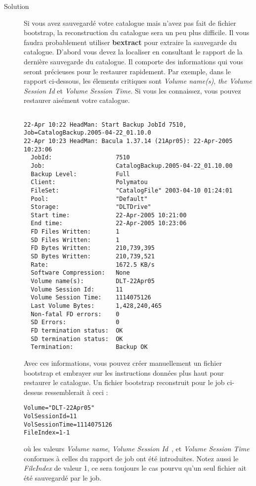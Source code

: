 \begin{description}
\item[Solution]
   Si vous avez sauvegard\'e votre catalogue mais n'avez pas fait de fichier 
   bootstrap, la reconstruction du catalogue sera un peu plus difficile. 
   Il vous faudra probablement utiliser {\bf bextract} pour extraire 
   la sauvegarde du catalogue. D'abord vous devez la localiser en 
   consultant le rapport de la derni\`ere sauvegarde du catalogue. Il comporte 
   des informations qui vous seront pr\'ecieuses pour le restaurer rapidement.
   Par exemple, dans le rapport ci-dessous, les \'elements critiques sont 
   {\it Volume name(s)}, {\it the Volume Session Id} et {\it Volume Session Time}. 
   Si vous les connaissez, vous pouvez restaurer ais\'ement votre catalogue.
\footnotesize
\begin{verbatim}

22-Apr 10:22 HeadMan: Start Backup JobId 7510,
Job=CatalogBackup.2005-04-22_01.10.0
22-Apr 10:23 HeadMan: Bacula 1.37.14 (21Apr05): 22-Apr-2005 10:23:06
  JobId:                  7510
  Job:                    CatalogBackup.2005-04-22_01.10.00
  Backup Level:           Full
  Client:                 Polymatou
  FileSet:                "CatalogFile" 2003-04-10 01:24:01
  Pool:                   "Default"
  Storage:                "DLTDrive"
  Start time:             22-Apr-2005 10:21:00
  End time:               22-Apr-2005 10:23:06
  FD Files Written:       1
  SD Files Written:       1
  FD Bytes Written:       210,739,395
  SD Bytes Written:       210,739,521
  Rate:                   1672.5 KB/s
  Software Compression:   None
  Volume name(s):         DLT-22Apr05
  Volume Session Id:      11
  Volume Session Time:    1114075126
  Last Volume Bytes:      1,428,240,465
  Non-fatal FD errors:    0
  SD Errors:              0
  FD termination status:  OK
  SD termination status:  OK
  Termination:            Backup OK

\end{verbatim}
\normalsize
  Avec ces informations, vous pouvez cr\'eer manuellement un fichier 
  bootstrap et embrayer sur les instructions donn\'ees plus haut pour 
  restaurer le catalogue. Un fichier bootstrap reconstruit pour le job 
  ci-dessus ressemblerait \`a ceci :

\footnotesize
\begin{verbatim}
Volume="DLT-22Apr05"
VolSessionId=11
VolSessionTime=1114075126
FileIndex=1-1
\end{verbatim}
\normalsize    
  
  o\`u les valeurs {\it Volume name}, {\it Volume Session Id} , et {\it Volume Session Time} 
  conformes \`a celles du rapport de job ont \'et\'e introduites. Notez aussi 
  le {\it FileIndex} de valeur 1, ce sera toujours le cas pourvu qu'un seul fichier 
  ait \'et\'e sauvegard\'e par le job.


\end{description}
